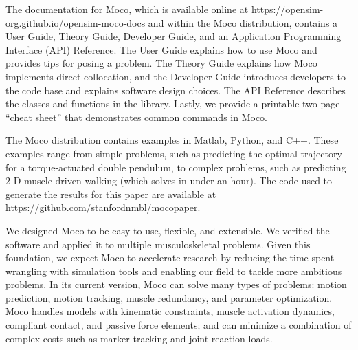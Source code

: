 \documentclass[10pt,letterpaper]{article}
\begin{document}
The documentation for Moco, which is available online at https://opensim-org.github.io/opensim-moco-docs and within the Moco distribution, contains a User Guide, Theory Guide, Developer Guide, and an Application Programming Interface (API) Reference. The User Guide explains how to use Moco and provides tips for posing a problem. The Theory Guide explains how Moco implements direct collocation, and the Developer Guide introduces developers to the code base and explains software design choices. The API Reference describes the classes and functions in the library. Lastly, we provide a printable two-page “cheat sheet” that demonstrates common commands in Moco.

The Moco distribution contains examples in Matlab, Python, and C++. These examples range from simple problems, such as predicting the optimal trajectory for a torque-actuated double pendulum, to complex problems, such as predicting 2-D muscle-driven walking (which solves in under an hour). The code used to generate the results for this paper are available at https://github.com/stanfordnmbl/mocopaper.

We designed Moco to be easy to use, flexible, and extensible. We verified the software and applied it to multiple musculoskeletal problems. Given this foundation, we expect Moco to accelerate research by reducing the time spent wrangling with simulation tools and enabling our field to tackle more ambitious problems. In its current version, Moco can solve many types of problems: motion prediction, motion tracking, muscle redundancy, and parameter optimization. Moco handles models with kinematic constraints, muscle activation dynamics, compliant contact, and passive force elements; and can minimize a combination of complex costs such as marker tracking and joint reaction loads.
\end{document}
